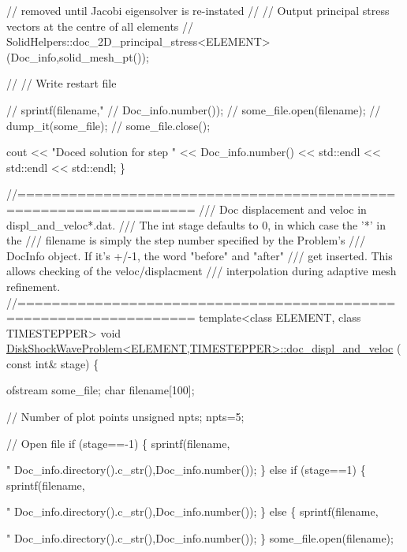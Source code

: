 \begin{DoxyCodeInclude}
{{{ \textcolor{comment}{// removed until Jacobi eigensolver is re-instated}
 \textcolor{comment}{// // Output principal stress vectors at the centre of all elements}
 \textcolor{comment}{// SolidHelpers::doc\_2D\_principal\_stress<ELEMENT>(Doc\_info,solid\_mesh\_pt());}

\textcolor{comment}{//  // Write restart file}
\textcolor{comment}{//  sprintf(filename,"%
\textcolor{comment}{//          Doc\_info.number());}
\textcolor{comment}{//  some\_file.open(filename);}
\textcolor{comment}{//  dump\_it(some\_file);}
\textcolor{comment}{//  some\_file.close();}
 

 cout << \textcolor{stringliteral}{"Doced solution for step "} 
      << Doc\_info.number() 
      << std::endl << std::endl << std::endl;
\}






\textcolor{comment}{//==================================================================}\textcolor{comment}{}
\textcolor{comment}{/// Doc displacement and veloc in displ\_and\_veloc*.dat.}
\textcolor{comment}{/// The int stage defaults to 0, in which case the '*' in the}
\textcolor{comment}{/// filename is simply the step number specified by the Problem's}
\textcolor{comment}{/// DocInfo object. If it's +/-1, the word "before" and "after"}
\textcolor{comment}{/// get inserted. This allows checking of the veloc/displacment}
\textcolor{comment}{/// interpolation during adaptive mesh refinement.}
\textcolor{comment}{}\textcolor{comment}{//==================================================================}
\textcolor{keyword}{template}<\textcolor{keyword}{class} ELEMENT, \textcolor{keyword}{class} TIMESTEPPER>
\textcolor{keywordtype}{void} \hyperlink{classDiskShockWaveProblem_a75403423b0a031adabb5b487fa88373f}{DiskShockWaveProblem<ELEMENT,TIMESTEPPER>::doc\_displ\_and\_veloc}
      (
 \textcolor{keyword}{const} \textcolor{keywordtype}{int}& stage)
\{

 ofstream some\_file;
 \textcolor{keywordtype}{char} filename[100];

 \textcolor{comment}{// Number of plot points}
 \textcolor{keywordtype}{unsigned} npts;
 npts=5; 

 \textcolor{comment}{// Open file}
 \textcolor{keywordflow}{if} (stage==-1)
  \{
   sprintf(filename,\textcolor{stringliteral}{"%
           Doc\_info.directory().c\_str(),Doc\_info.number());
  \}
 \textcolor{keywordflow}{else} \textcolor{keywordflow}{if} (stage==1)
  \{
   sprintf(filename,\textcolor{stringliteral}{"%
           Doc\_info.directory().c\_str(),Doc\_info.number());
  \}
 \textcolor{keywordflow}{else} 
  \{
   sprintf(filename,\textcolor{stringliteral}{"%
           Doc\_info.directory().c\_str(),Doc\_info.number());
  \}
 some\_file.open(filename);

}}}}}}}
\end{DoxyCodeInclude}
